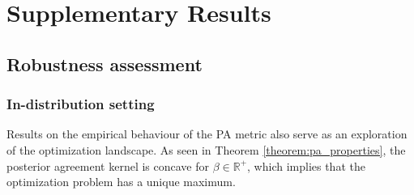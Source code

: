 \cleardoublepage


\chapter{Supplementary Results}\label{sec:appendix_results}

\section{Robustness assessment}\label{sec:appendix_results_pametric}

\subsection{In-distribution setting}\label{subsec:appendix_empirical_behaviour}

Results on the empirical behaviour of the PA metric also serve as an exploration of
the optimization landscape. As seen in Theorem \ref{theorem:pa_properties}, the posterior agreement
kernel is concave for $\beta \in \mathbb{R}^+$, which implies that the optimization problem
has a unique maximum. 

